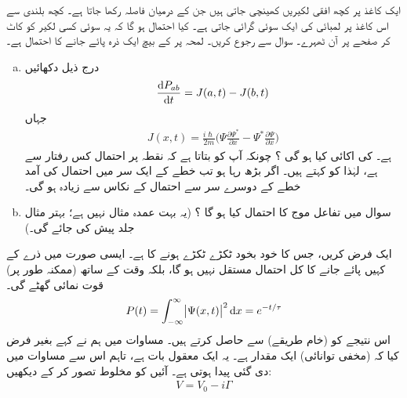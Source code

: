  ایک کاغذ پر کچھ افقی لکیریں کھینچی جاتی ہیں جن کے درمیان فاصلہ  رکھا جاتا ہے۔ کچھ بلندی سے اس کاغذ پر  لمبائی کی ایک سوئی گرائی جاتی ہے۔ کیا احتمال ہو گا کہ یہ سوئی کسی لکیر کو کاٹ کر صفحے پر آن ٹھہرے۔  سوال  سے رجوع کریں۔ 
 لمحہ  پر  کے بیچ ایک ذرہ پائے جانے کا احتمال  ہے۔ 
\begin{enumerate}[a.]
\item
 درج ذیل دکھائیں
\begin{align*}
\frac{ \dif P_{ab} }{ \dif t } = J ( a , t ) - J ( b , t )
\end{align*}
جہاں 
\begin{align*}
J( x , t ) = \frac{ i\hslash}{ 2 m } \big( \Psi \frac{ \partial \Psi^* }{ \partial x } - \Psi^* \frac{ \partial \Psi }{ \partial x } \big)
\end{align*}
ہے۔  کی اکائی کیا ہو گی ؟  چونکہ  آپ کو بتاتا ہے کہ نقطہ  پر احتمال کس رفتار سے  ہے، لہٰذا  کو  کہتے ہیں۔ اگر  بڑھ رہا ہو تب خطے کے ایک سر میں احتمال کی آمد خطے کے دوسرے سر سے احتمال کے نکاس سے زیادہ ہو گی۔ 
\item
 سوال  میں تفاعل موج کا احتمال  کیا ہو گا ؟ (یہ بہت عمدہ مثال نہیں ہے؛ بہتر مثال جلد پیش کی جائے گی۔)
\end{enumerate}
 ایک  فرض کریں، جس کا خود بخود ٹکڑے ٹکڑے ہونے کا   ہے۔ ایسی صورت میں ذرے کے کہیں پائے جانے کا کل احتمال مستقل نہیں ہو گا، بلکہ وقت کے ساتھ (ممکنہ طور پر) قوت نمائی گھٹے گی۔
\begin{align*}
P(t) = \int_{-\infty }^{ \infty } \abs{\Psi ( x , t )}^2 \dif x=e^{-t/\tau}
\end{align*} 
 اس نتیجے کو (خام طریقے) سے حاصل کرتے ہیں۔ مساوات  میں ہم نے کہے بغیر فرض کیا کہ (مخفی توانائی)  ایک  مقدار ہے۔ یہ ایک معقول بات ہے، تاہم اس سے مساوات  میں دی گئی  پیدا ہوتی ہے۔ آئیں  کو مخلوط تصور کر کے دیکھیں:
\begin{align*}
V = V_0 - i \Gamma
\end{align*}
